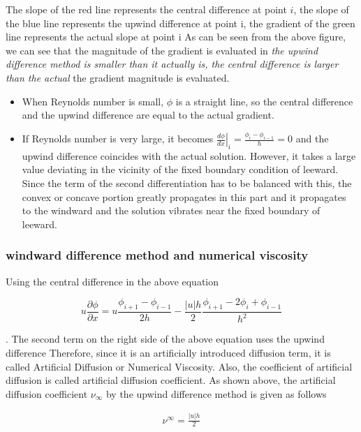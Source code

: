 The slope of the red line represents the central difference at point $i$, the slope of the blue line represents the upwind difference at point i, the gradient of the green line represents the actual slope at point i
As can be seen from the above figure, we can see that the magnitude of the gradient is evaluated in \emph{the upwind difference method is smaller than it actually is, the central difference is larger than the actual} the gradient magnitude is evaluated.
%
\begin {itemize}
\item When Reynolds number is small, $\phi$ is a straight line, so the central difference and the upwind difference are equal to the actual gradient.
\item If Reynolds number is very large, it becomes $\left.\frac{d \phi}{d x}\right |_i=\frac{\phi_i-\phi_{i-1}}{h}=0$ and the upwind difference coincides with the actual solution. However, it takes a large value deviating in the vicinity of the fixed boundary condition of leeward. Since the term of the second differentiation has to be balanced with this, the convex or concave portion greatly propagates in this part and it propagates to the windward and the solution vibrates near the fixed boundary of leeward.
\end {itemize}



\subsubsection{windward difference method and numerical viscosity}
Using the central difference in the above equation

\begin{equation}
u\frac{\partial\phi}{\partial x} = u\frac{\phi_{i+1}-\phi_{i-1}}{2h} - \frac{|u|h}{2} \frac{\phi_{i+1}-2\phi_i+\phi_{i-1}}{h^2}
\end{equation}

. The second term on the right side of the above equation uses the upwind difference
Therefore, since it is an artificially introduced diffusion term, it is called Artificial Diffusion or Numerical Viscosity. Also, the coefficient of artificial diffusion is called artificial diffusion coefficient.
As shown above, the artificial diffusion coefficient $\nu_{\infty}$ by the upwind difference method is given as follows

\begin{tcolorbox}[title=artificial diffusion coefficient by upwind difference method]
\begin{eqnarray}
\nu^{\infty} = \frac{|u|h}{2}
\end{eqnarray}
\end{tcolorbox}

